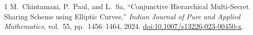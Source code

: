 \documentclass[11pt]{article}
\begin{document}
\begin{thebibliography}{1}
M.~Chintamani, P.~Paul, and L.~Sa,
``Conjunctive Hierarchical Multi-Secret Sharing Scheme using Elliptic Curves,''
\emph{Indian Journal of Pure and Applied Mathematics}, vol.~55, pp.~1456--1464, 2024.
\href{https://doi.org/10.1007/s13226-023-00450-x}{doi:10.1007/s13226-023-00450-x}.
\end{thebibliography}
\end{document}
